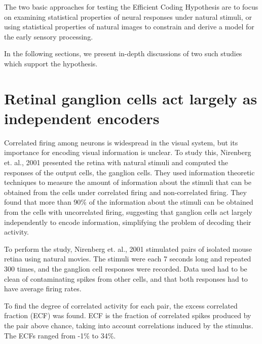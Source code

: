 \documentclass[twoside]{article}
\begin{document}
\begin{multicols}{2}
The two basic approaches for testing the Efficient Coding Hypothesis are to focus on examining statistical properties of neural responses under natural stimuli, or using statistical properties of natural images to constrain and derive a model for the early sensory processing.

In the following sections, we present in-depth discussions of two such studies which support the hypothesis. 






\section{Retinal ganglion cells act largely as independent encoders}

Correlated firing among neurons is widespread in the visual system, but its importance for encoding visual information is unclear. To study this, Nirenberg et. al., 2001 presented the retina with natural stimuli and computed the responses of the output cells, the ganglion cells. They used information theoretic techniques to measure the amount of information about the stimuli that can be obtained from the cells under correlated firing and non-correlated firing. They found that more than 90\% of the information about the stimuli can be obtained from the cells with uncorrelated firing, suggesting that ganglion cells act largely independently to encode information, simplifying the problem of decoding their activity. 

To perform the study, Nirenberg et. al., 2001 stimulated pairs of isolated mouse retina using natural movies. The stimuli were each 7 seconds long and repeated 300 times, and the ganglion cell responses were recorded. Data used had to be clean of contaminating spikes from other cells, and that both responses had to have average firing rates. 

To find the degree of correlated activity for each pair, the excess correlated fraction (ECF) was found. ECF is the fraction of correlated spikes produced by the pair above chance, taking into account correlations induced by the stimulus. The ECFs ranged from -1\% to 34\%. 


\end{multicols}
\end{document}
